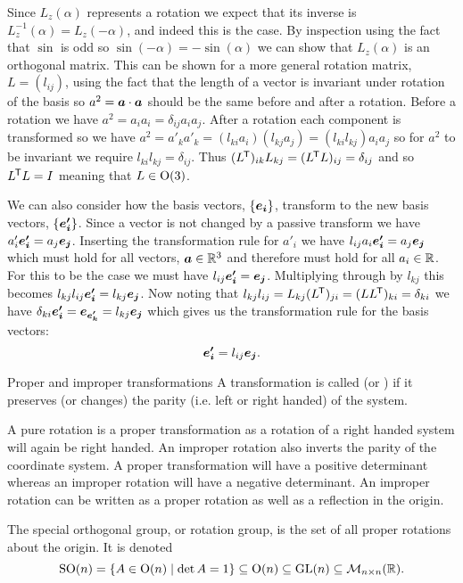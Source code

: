 Since \(L_z(\alpha)\) represents a rotation we expect that its inverse is \(L_z^{-1}(\alpha) = L_z(-\alpha)\), and indeed this is the case.
By inspection using the fact that \(\sin\) is odd so \(\sin(-\alpha) = -\sin(\alpha)\) we can show that \(L_z(\alpha)\) is an orthogonal matrix.
This can be shown for a more general rotation matrix, \(L = (l_{ij})\), using the fact that the length of a vector is invariant under rotation of the basis so \(a^2 = \bm{a}\cdot\bm{a}\) should be the same before and after a rotation.
Before a rotation we have \(a^2 = a_ia_i = \delta_{ij} a_ia_j\).
After a rotation each component is transformed so we have \(a^2 = a'_ka'_k = (l_{ki}a_i)(l_{kj}a_j) = (l_{ki}l_{kj})a_ia_j\) so for \(a^2\) to be invariant we require \(l_{ki}l_{kj} = \delta_{ij}\).
Thus \((L^{\mkern-1.5mu\mathsf{T}})_{ik}L_{kj} = (L^{\mkern-1.5mu\mathsf{T}} L)_{ij} = \delta_{ij}\) and so \(L^{\mkern-1.5mu\mathsf{T}} L = I\) meaning that \(L\in\mathrm{O}(3)\).

We can also consider how the basis vectors, \(\{\bm{e_{i}}\}\), transform to the new basis vectors, \(\{\bm{e'_i}\}\).
Since a vector is not changed by a passive transform we have \(a'_i\bm{e'_i} = a_j\bm{e_{j}}\).
Inserting the transformation rule for \(a'_{i}\) we have \(l_{ij}a_i\bm{e'_i} = a_j\bm{e_{j}}\) which must hold for all vectors, \(\bm{a}\in\mathbb{R}^3\) and therefore must hold for all \(a_i\in\mathbb{R}\).
For this to be the case we must have \(l_{ij}\bm{e'_i} = \bm{e_{j}}\).
Multiplying through by \(l_{kj}\) this becomes \(l_{kj}l_{ij}\bm{e'_i} = l_{kj}\bm{e_{j}}\).
Now noting that \(l_{kj}l_{ij} = L_{kj}(L^{\mkern-1.5mu\mathsf{T}})_{ji} = (LL^{\mkern-1.5mu\mathsf{T}})_{ki} = \delta_{ki}\) we have \(\delta_{ki}\bm{e'_i} = \bm{e_{e'_k}} = l_{kj}\bm{e_{j}}\) which gives us the transformation rule for the basis vectors:
\[\bm{e'_i} = l_{ij}\bm{e_{j}}.\]

\begin{definition}{Proper and improper transformations}{}
    A transformation is called  (or ) if it preserves (or changes) the parity (i.e. left or right handed) of the system.
\end{definition}
A pure rotation is a proper transformation as a rotation of a right handed system will again be right handed.
An improper rotation also inverts the parity of the coordinate system.
A proper transformation will have a positive determinant whereas an improper rotation will have a negative determinant.
An improper rotation can be written as a proper rotation as well as a reflection in the origin.
\begin{notation*}{}
    The special orthogonal group, or rotation group, is the set of all proper rotations about the origin.
    It is denoted
    \[\mathrm{SO}(n) = \{A\in\mathrm{O}(n)\mid \det A = 1\} \subseteq \mathrm{O}(n) \subseteq \mathrm{GL}(n) \subseteq \mathcal{M}_{{n}\times{n}}({\mathbb{R}}).\]
\end{notation*}

